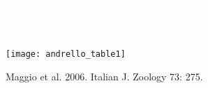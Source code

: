 \documentclass[t]{beamer}
\begin{document}

{
\begin{frame}[b]{\textcolor{white}{\textit{Epinephelus marginatus}}}

\hfill \tiny \textcolor{white}{Parent Géry, Wikimedia, }
\end{frame}
}

{
\begin{frame}[t]
\end{frame}
}

{
\begin{frame}[t]
\end{frame}
}

{
\begin{frame}[t]
\end{frame}
}


\begin{frame}[t]
	\begin{center}
		\texttt{[image: andrello\_table1]}
	\end{center}
\end{frame}

{
\begin{frame}[b]

\hfill \tiny Maggio et al. 2006. Italian J. Zoology 73: 275.
\end{frame}
}
\end{document}
